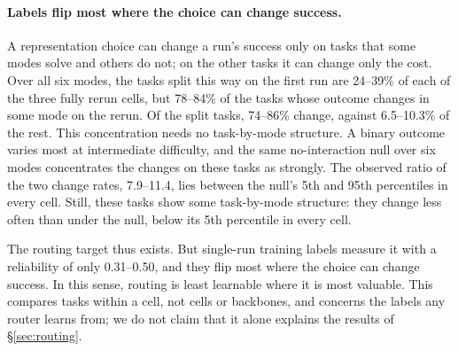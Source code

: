 \paragraph{Labels flip most where the choice can change success.} A representation choice can change a run's success only on tasks that some modes solve and others do not; on the other tasks it can change only the cost. Over all six modes, the tasks split this way on the first run are 24--39\% of each of the three fully rerun cells, but 78--84\% of the tasks whose outcome changes in some mode on the rerun. Of the split tasks, 74--86\% change, against 6.5--10.3\% of the rest. %
This concentration needs no task-by-mode structure. A binary outcome varies most at intermediate difficulty, and the same no-interaction null over six modes concentrates the changes on these tasks as strongly. The observed ratio of the two change rates, 7.9--11.4, lies between the null's 5th and 95th percentiles in every cell. Still, these tasks show some task-by-mode structure: they change less often than under the null, below its 5th percentile in every cell. %

The routing target thus exists. But single-run training labels measure it with a reliability of only 0.31--0.50, and they flip most where the choice can change success. In this sense, routing is least learnable where it is most valuable. This compares tasks within a cell, not cells or backbones, and concerns the labels any router learns from; we do not claim that it alone explains the results of \S\ref{sec:routing}.
